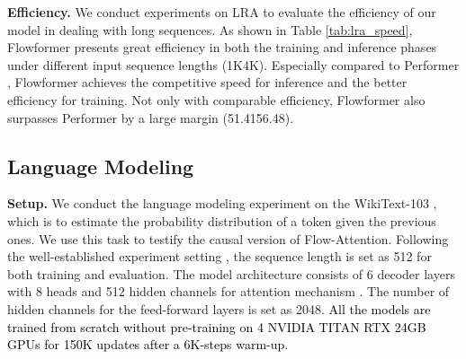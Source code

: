 \documentclass[nohyperref]{article}
\theoremstyle{plain}
\theoremstyle{definition}
\theoremstyle{remark}
\newcommand{\update}[1]{{\textcolor{black}{#1}}}
\begin{document}
\textbf{Efficiency.} We conduct experiments on LRA to evaluate the efficiency of our model in dealing with long sequences. As shown in Table \ref{tab:lra_speed}, Flowformer presents great efficiency in both the training and inference phases under different input sequence lengths (1K4K). Especially compared to Performer \cite{performer}, Flowformer achieves the competitive speed for inference and the better efficiency for training. Not only with comparable efficiency, Flowformer also surpasses Performer by a large margin (51.4156.48).


\subsection{Language Modeling}

\textbf{Setup.} We conduct the language modeling experiment on the WikiText-103 \cite{Merity2017PointerSM}, which is to estimate the probability distribution of a token given the previous ones. We use this task to testify the causal version of Flow-Attention. Following the well-established experiment setting \cite{Peng2021RandomFA}, the sequence length is set as 512 for both training and evaluation. The model architecture consists of 6 decoder layers with 8 heads and 512 hidden channels for attention mechanism \cite{ott2019fairseq}. The number of hidden channels for the feed-forward layers is set as 2048. \update{All the models are trained from scratch without pre-training on 4 NVIDIA TITAN RTX 24GB GPUs for 150K updates after a 6K-steps warm-up.}
\end{document}
